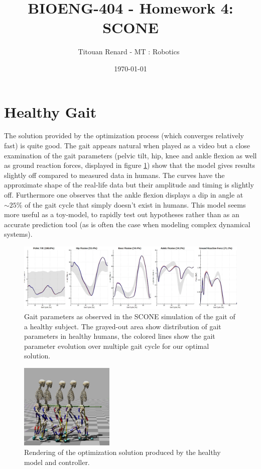 \documentclass[11pt]{article}
\title{BIOENG-404 - Homework 4: SCONE}
\author{
    Titouan Renard
    - MT : Robotics 
}
\date{\today}
\begin{document}
\maketitle

\section{Healthy Gait}

The solution provided by the optimization process (which converges relatively fast) is quite good. The gait appears natural when played as a video but a close examination of the gait parameters (pelvic tilt, hip, knee and ankle flexion as well as ground reaction forces, displayed in figure \ref{healthy_gait}) show that the model gives results slightly off compared to measured data in humans. The curves have the approximate shape of the real-life data but their amplitude and timing is slightly off. Furthermore one observes that the ankle flexion displays a dip in angle at $\sim 25\%$ of the gait cycle that simply doesn't exist in humans. This model seems more useful as a toy-model, to rapidly test out hypotheses rather than as an accurate prediction tool (as is often the case when modeling complex dynamical systems).

\begin{figure}[h!]
    \centering
    \includegraphics[width=\textwidth]{screens/healthy_gait.png}
    \caption{Gait parameters as observed in the SCONE simulation of the gait of a healthy subject. The grayed-out area show distribution of gait parameters in healthy humans, the colored lines show the gait parameter evolution over multiple gait cycle for our optimal solution.}
    \label{healthy_gait}
\end{figure}

\begin{figure}[h!]
    \centering
    \includegraphics[width=0.4\textwidth]{screens/healthy_walk.jpg}
    \caption{Rendering of the optimization solution produced by the healthy model and controller.}
    \label{healthy_render}
\end{figure}
\end{document}
